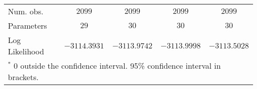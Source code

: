 \begin{table*}
\begin{center}
{\begin{tabular}{l c c c c}
\midrule
Num. obs.                           & $2099$                & $2099$                & $2099$                & $2099$                \\
Parameters                          & $29$                  & $30$                  & $30$                  & $30$                  \\
Log Likelihood                      & $-3114.3931$          & $-3113.9742$          & $-3113.9998$          & $-3113.5028$          \\
\bottomrule
\multicolumn{5}{l}{\scriptsize{$^*$ 0 outside the confidence interval. 95\% confidence interval in brackets.}}
\end{tabular}
}\end{center}
\end{table*}


